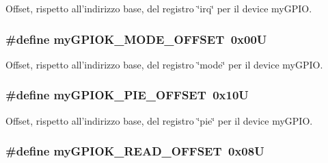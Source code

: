 Offset, rispetto all'indirizzo base, del registro \char`\"{}irq\char`\"{} per il device my\+G\+P\+I\+O. 

\hypertarget{group__ausiliarie_ga543e17293942b7cf7936a5e095ddc7ef}{
\subsubsection[{my\+G\+P\+I\+O\+K\+\_\+\+M\+O\+D\+E\+\_\+\+O\+F\+F\+S\+E\+T}]{\setlength{\rightskip}{0pt plus 5cm}\#define my\+G\+P\+I\+O\+K\+\_\+\+M\+O\+D\+E\+\_\+\+O\+F\+F\+S\+E\+T~0x00\+U}}\label{group__ausiliarie_ga543e17293942b7cf7936a5e095ddc7ef}


Offset, rispetto all'indirizzo base, del registro \char`\"{}mode\char`\"{} per il device my\+G\+P\+I\+O. 

\hypertarget{group__ausiliarie_ga2ed7646e6f910f5803477e51b7fe26e3}{
\subsubsection[{my\+G\+P\+I\+O\+K\+\_\+\+P\+I\+E\+\_\+\+O\+F\+F\+S\+E\+T}]{\setlength{\rightskip}{0pt plus 5cm}\#define my\+G\+P\+I\+O\+K\+\_\+\+P\+I\+E\+\_\+\+O\+F\+F\+S\+E\+T~0x10\+U}}\label{group__ausiliarie_ga2ed7646e6f910f5803477e51b7fe26e3}


Offset, rispetto all'indirizzo base, del registro \char`\"{}pie\char`\"{} per il device my\+G\+P\+I\+O. 

\hypertarget{group__ausiliarie_gabdb25f3ecdfbf053f4ca207930a56599}{
\subsubsection[{my\+G\+P\+I\+O\+K\+\_\+\+R\+E\+A\+D\+\_\+\+O\+F\+F\+S\+E\+T}]{\setlength{\rightskip}{0pt plus 5cm}\#define my\+G\+P\+I\+O\+K\+\_\+\+R\+E\+A\+D\+\_\+\+O\+F\+F\+S\+E\+T~0x08\+U}}\label{group__ausiliarie_gabdb25f3ecdfbf053f4ca207930a56599}


